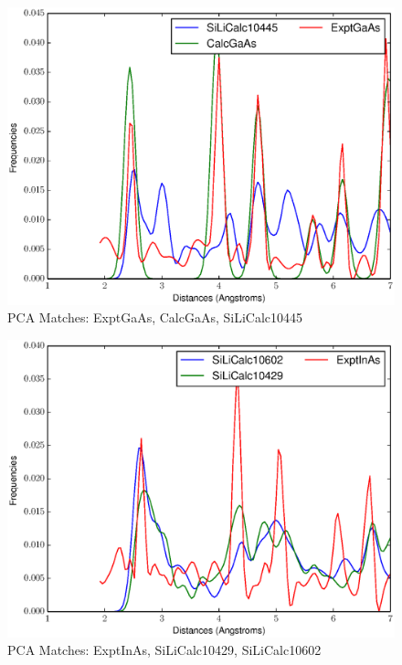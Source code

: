 \documentclass[12pt,letterpaper]{article}
\begin{document}
\begin{figure}[ht]
\begin{center}
\includegraphics[scale=0.8]{figs/PC128MatchExptGaAs-CalcGaAs-SiLiCalc10445.eps}
\caption{PCA Matches: ExptGaAs, CalcGaAs, SiLiCalc10445}
\end{center}
\end{figure}

\begin{figure}[ht]
\begin{center}
\includegraphics[scale=0.8]{figs/PC128MatchExptInAs-SiLiCalc10429-SiLiCalc10602.eps}
\caption{PCA Matches: ExptInAs, SiLiCalc10429, SiLiCalc10602}
\end{center}
\end{figure}
\end{document}
